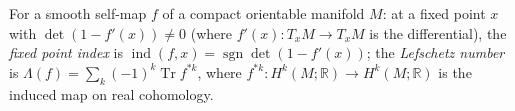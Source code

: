\hypertarget{def:lefschetz-fixed-point-data}{}%
\begin{definition}\label{def:lefschetz-fixed-point-data}
For a smooth self-map $f$ of a compact orientable
manifold $M$: at a fixed point $x$ with $\det(1-f'(x))\ne0$ (where
$f'(x)\colon T_xM\to T_xM$ is the differential), the \emph{fixed point index} is
$\operatorname{ind}(f,x)=\operatorname{sgn}\det(1-f'(x))$; the \emph{Lefschetz number}
is $\Lambda(f)=\sum_k(-1)^k\operatorname{Tr}f^{*k}$, where
$f^{*k}\colon H^k(M;\mathbb R)\to H^k(M;\mathbb R)$ is the induced map on real
cohomology.
\end{definition}
